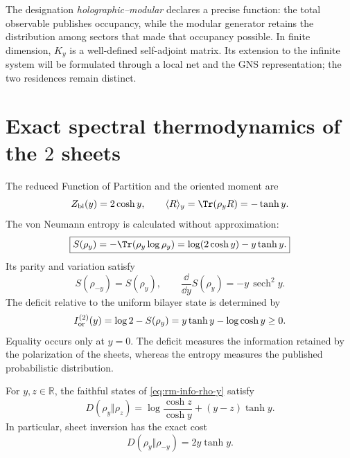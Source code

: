 The designation \emph{holographic--modular} declares a precise function:
the total observable publishes occupancy, while the modular generator
retains the distribution among sectors that made that occupancy possible. In
finite dimension, \(K_y\) is a well-defined self-adjoint matrix. Its
extension to the infinite system will be formulated through a local net and the
GNS representation; the two residences remain distinct.

\section{Exact spectral thermodynamics of the \(2\) sheets}

The reduced Function of Partition and the oriented moment are
\begin{equation}
 Z_{\rm bi}(y)=2\cosh y,
 \qquad
 \langle R\rangle_y=\Tr(\rho_yR)=-\tanh y.
 \label{eq:rm-info-particion-momento}
\end{equation}
The von Neumann entropy is calculated without approximation:
\begin{equation}
 \boxed{
 S(\rho_y)
 =-\Tr(\rho_y\log\rho_y)
 =\log(2\cosh y)-y\tanh y.}
 \label{eq:rm-info-entropia-bicapa}
\end{equation}
Its parity and variation satisfy
\begin{equation}
 S(\rho_{-y})=S(\rho_y),
 \qquad
 \frac{\dd}{\dd y}S(\rho_y)=-y\,\operatorname{sech}^2y.
 \label{eq:rm-info-paridad-entropia}
\end{equation}
The deficit relative to the uniform bilayer state is determined by
\begin{equation}
 I_{\rm or}^{(2)}(y)
 =\log2-S(\rho_y)
 =y\tanh y-\log\cosh y
 \geq0.
 \label{eq:rm-info-deficit-orientado}
\end{equation}
Equality occurs only at \(y=0\). The deficit measures the information
retained by the polarization of the sheets, whereas the entropy measures the
published probabilistic distribution.

\begin{theorem}
\label{thm:rm-info-relative-general}
For \(y,z\in\mathbb R\), the faithful states of
\cref{eq:rm-info-rho-y} satisfy
\begin{equation}
 \boxed{
 D(\rho_y\Vert\rho_z)
 =\log\frac{\cosh z}{\cosh y}
 +(y-z)\tanh y.}
 \label{eq:rm-info-relative-general}
\end{equation}
In particular, sheet inversion has the exact cost
\begin{equation}
 \boxed{
 D(\rho_y\Vert\rho_{-y})=2y\tanh y.}
 \label{eq:rm-info-relative-inversion}
\end{equation}
\end{theorem}

